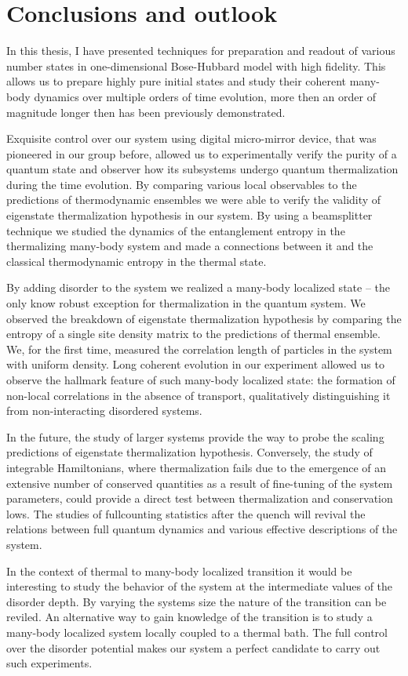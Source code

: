 
\chapter{Conclusions and outlook}

In this thesis, I have presented techniques for preparation and readout of various number states in one-dimensional Bose-Hubbard model with high fidelity. This allows us to prepare highly pure initial states and study their coherent many-body dynamics over multiple orders of time evolution, more then an order of magnitude longer then has been previously demonstrated. 

Exquisite control over our system using digital micro-mirror device, that was pioneered in our group before, allowed us  to experimentally verify the purity of a quantum state and observer how its subsystems undergo quantum thermalization during the time evolution. By comparing various local observables to the predictions of thermodynamic ensembles we were able to verify the validity of eigenstate thermalization hypothesis in our system. By using a beamsplitter technique we studied the dynamics of the entanglement entropy in the thermalizing many-body system and made a connections between it and the classical thermodynamic entropy in the thermal state.

By adding disorder to the system we realized a many-body localized state -- the only know robust exception for thermalization in the quantum system. We observed the breakdown of eigenstate thermalization hypothesis by comparing the entropy of a single site density matrix to the predictions of thermal ensemble. We, for the first time, measured the correlation length of particles in the system with uniform density. Long coherent evolution in our experiment allowed us to observe the hallmark feature of such many-body localized state: the formation of non-local correlations in the absence of transport, qualitatively distinguishing it from non-interacting disordered systems.

In the future, the study of larger systems provide the way to probe the scaling predictions of eigenstate thermalization hypothesis. Conversely, the study of integrable Hamiltonians, where thermalization fails due to the emergence of an extensive number of conserved quantities as a result of fine-tuning of the system parameters, could provide a direct test between thermalization and conservation lows. The studies of fullcounting statistics after the quench will revival the relations between full quantum dynamics and various effective descriptions of the system.

In the context of thermal to many-body localized transition it would be interesting to study the behavior of the system at the intermediate values of the disorder depth. By varying the systems size the nature of the transition can be reviled. An alternative way to gain knowledge of the transition is to study a many-body localized system locally coupled to a thermal bath. The full control over the disorder potential makes our system a perfect candidate to carry out such experiments. 